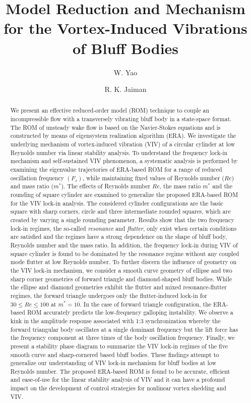 \documentclass{jfm}
\title{Model Reduction and Mechanism for the Vortex-Induced Vibrations of Bluff Bodies}
\author{W. Yao
  \and  R. K. Jaiman
   \corresp{\email{mperkj@nus.edu.sg}}
  }
\affiliation{Department of Mechanical Engineering, National University Singapore, Singapore 119077}
\begin{document}
\maketitle

\begin{abstract}
We present an effective reduced-order model (ROM) technique to couple 
an incompressible flow with a transversely vibrating bluff body in a state-space format.
%
The ROM of unsteady wake flow is based on the Navier-Stokes equations 
and is constructed by means of eigensystem realization algorithm (ERA).
%
We investigate the  underlying mechanism of vortex-induced vibration (VIV) 
of a circular cylinder at low Reynolds number via linear stability analysis.
%
To understand the frequency lock-in mechanism and self-sustained VIV phenomenon, 
a systematic analysis is performed by examining the eigenvalue trajectories  
of ERA-based ROM for a range of reduced oscillation frequency $(F_s)$, 
while maintaining fixed values of Reynolds number ($Re$) and mass ratio ($m^*$).
%
The effects of Reynolds number $Re$, the mass ratio $m^*$ and the rounding of square cylinder 
are examined to generalize the proposed ERA-based ROM for the VIV lock-in analysis.  
The considered cylinder configurations are the basic square with sharp corners, 
circle and three intermediate rounded squares, which are created 
by varying a single rounding parameter. 
%
Results show that the two frequency lock-in regimes, the so-called 
\emph{resonance} and \emph{flutter},  
only exist when certain conditions are satisfied and the regimes 
have a strong dependence on the shape of bluff body, Reynolds number and the mass ratio. 
%
In addition, the frequency lock-in during VIV of square cylinder 
is found to be dominated by the resonance regime without any coupled mode 
flutter at low Reynolds number. 
%
To further discern the influence of geometry on the VIV lock-in mechanism, we consider a smooth curve 
geometry of ellipse and two sharp corner geometries of forward triangle and diamond-shaped 
bluff bodies.
%
While the ellipse and diamond geometries exhibit the 
flutter and mixed resonance-flutter regimes, the forward triangle undergoes only 
the flutter-induced lock-in for $30 \le Re \le 100 $ at $m^*=10$.
In the case of forward triangle configuration, the ERA-based ROM accurately predicts 
the low-frequency galloping instability. We observe a kink in the amplitude 
response associated with 1:3 synchronization whereby 
the forward triangular body oscillates at a single dominant frequency but the lift force 
has the frequency component at three times of the body oscillation frequency. 
%
Finally, we present a stability phase diagram to summarize 
the VIV lock-in regimes of the five smooth curve and sharp-cornered based bluff bodies.
%
These findings attempt to generalize our understanding of VIV lock-in mechanism 
for bluff bodies at low Reynolds number.
%
The proposed ERA-based ROM is found to be accurate, efficient 
and ease-of-use for the linear stability analysis of VIV and it can have a profound 
impact on the development of control strategies for nonlinear vortex shedding and VIV.
\end{abstract}
\end{document}
